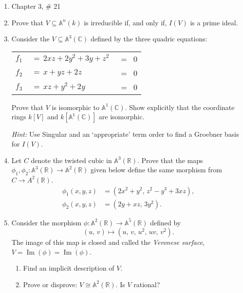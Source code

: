 \documentclass[11pt]{report}
\newcommand\CC{{\mathbb C}}
\newcommand\RR{{\mathbb R}}
\newcommand\A{{\mathbb A}}
\newcommand\image{\operatorname{Im}}
\begin{document}
\enlargethispage{.5cm}


\vskip 1cm

\begin{enumerate}

\item Chapter 3, \# 21

\item Prove that $V \subseteq \A^n(k)$ is irreducible if, and only if, $I(V)$ is a prime ideal.

\item Consider the $V \subseteq \A^3(\CC)$ defined by the three quadric equations:
\begin{center}
\begin{tabular}{rll}
$f_1$ & $\, = \, 2xz+2y^2+3y + z^2$ &\, = \, 0\\
$f_2$ & $\, = \, x+yz+2z$ &\, = \, 0\\
$f_3$ & $\, = \, xz+y^2+2y$ &\, = \, 0
\end{tabular}
\end{center}

Prove that $V$ is isomorphic to $\A^1(\CC)$.  Show explicitly that the coordinate rings
$k[V]$ and $k[\A^1(\CC)]$ are isomorphic.

\emph{Hint:}  Use Singular and an `appropriate' term order to find a Groebner basis for 
$I(V)$.

\item Let $C$ denote the twisted cubic in $\A^3(\RR)$.  Prove that the maps
$\phi_1, \phi_2: \A^3(\RR) \to \A^2(\RR)$ given below
define the same morphism from $C \to A^2(\RR)$.
\begin{align*}
\phi_1(x,y,z) &= (2x^2 + y^2, \, z^2-y^3+3xz),\\
 \phi_2(x,y,z) &= (2y+xz, \, 3y^2).
\end{align*}

\item Consider the morphism $\phi: \A^2(\RR) \to \A^5(\RR)$ defined
by 
$$
(u,\, v) \mapsto (u,\, v,\, u^2,\, uv, \,v^2).
$$
The image of this map is closed and called the \emph{Veronese surface},
$V =\image(\phi) = \overline{\image(\phi)}$.

\begin{enumerate}

\item Find an implicit description of $V$.

\item Prove or disprove: $V \cong \A^2(\RR)$.  Is $V$ rational?


\end{enumerate}
\end{enumerate}
\end{document}
